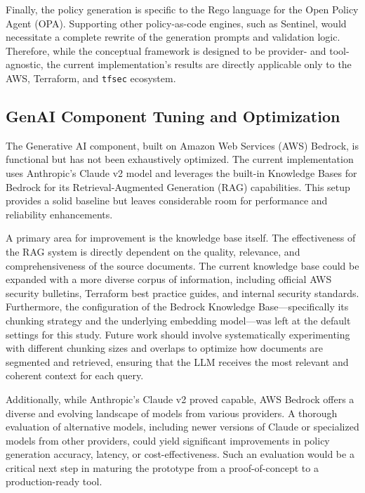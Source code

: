 Finally, the policy generation is specific to the Rego language for the Open Policy Agent (OPA). Supporting other policy-as-code engines, such as Sentinel, would necessitate a complete rewrite of the generation prompts and validation logic. Therefore, while the conceptual framework is designed to be provider- and tool-agnostic, the current implementation's results are directly applicable only to the AWS, Terraform, and \texttt{tfsec} ecosystem.

\subsection{GenAI Component Tuning and Optimization}
The Generative AI component, built on Amazon Web Services (AWS) Bedrock, is functional but has not been exhaustively optimized. The current implementation uses Anthropic's Claude v2 model and leverages the built-in Knowledge Bases for Bedrock for its Retrieval-Augmented Generation (RAG) capabilities. This setup provides a solid baseline but leaves considerable room for performance and reliability enhancements.

A primary area for improvement is the knowledge base itself. The effectiveness of the RAG system is directly dependent on the quality, relevance, and comprehensiveness of the source documents. The current knowledge base could be expanded with a more diverse corpus of information, including official AWS security bulletins, Terraform best practice guides, and internal security standards. Furthermore, the configuration of the Bedrock Knowledge Base—specifically its chunking strategy and the underlying embedding model—was left at the default settings for this study. Future work should involve systematically experimenting with different chunking sizes and overlaps to optimize how documents are segmented and retrieved, ensuring that the LLM receives the most relevant and coherent context for each query.

Additionally, while Anthropic's Claude v2 proved capable, AWS Bedrock offers a diverse and evolving landscape of models from various providers. A thorough evaluation of alternative models, including newer versions of Claude or specialized models from other providers, could yield significant improvements in policy generation accuracy, latency, or cost-effectiveness. Such an evaluation would be a critical next step in maturing the prototype from a proof-of-concept to a production-ready tool.

